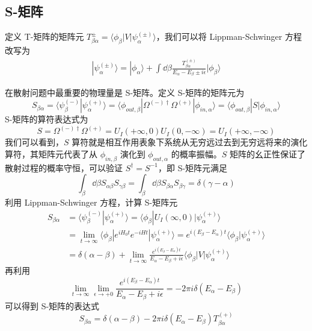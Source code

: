 \subsection{S-矩阵}
定义 T-矩阵的矩阵元 $T_{\beta\alpha}^{\pm}=\langle \phi_\beta|V|\psi_\alpha^{(\pm)}\rangle$，我们可以将 Lippman-Schwinger 方程改写为
\begin{equation}
\begin{aligned}
|\psi_\alpha^{(\pm)}\rangle= |\phi_{\alpha}\rangle+\int \dd\beta \frac{T_{\beta\alpha}^{(\pm)}}{E_\alpha-E_\beta\pm i\epsilon}|\phi_{\beta}\rangle
\end{aligned}
\end{equation}

在散射问题中最重要的物理量是 S-矩阵。定义 S-矩阵的矩阵元为
\begin{equation}
S_{\beta\alpha}=\langle \psi_{\beta}^{(-)}| \psi_{\alpha}^{(+)}\rangle=\langle \phi_{out,\beta}| \Omega^{(-)\dagger}\Omega^{(+)}|\phi_{in,\alpha}\rangle=\langle \phi_{out,\beta}| S |\phi_{in,\alpha}\rangle
\end{equation}
S-矩阵的算符表达式为
\begin{equation}
S=\Omega^{(-)\dagger}\Omega^{(+)}=U_I(+\infty,0)U_I(0,-\infty)=U_I(+\infty,-\infty)
\end{equation}
我们可以看到，$S$ 算符就是相互作用表象下系统从无穷远过去到无穷远将来的演化算符，其矩阵元代表了从 $\phi_{in,\beta}$ 演化到 $\phi_{out,\alpha}$ 的概率振幅。$S$ 矩阵的幺正性保证了散射过程的概率守恒，可以验证 $S^\dagger=S^{-1}$，即 S-矩阵元满足
\begin{equation}
\int_{\beta}\dd \beta S_{\alpha\beta}S_{\gamma\beta}=\int_{\beta}\dd \beta S_{\beta\alpha}S_{\beta\gamma}=\delta(\gamma-\alpha)
\end{equation}
利用 Lippman-Schwinger 方程，计算 S-矩阵元
\begin{equation}
\begin{aligned}
S_{\beta\alpha}&=\langle \psi_{\beta}^{(-)}| \psi_{\alpha}^{(+)}\rangle = \langle \phi_\beta|U_I(\infty,0)|\psi_{\alpha}^{(+)}\rangle\\
&=\lim\limits_{t\rightarrow \infty} \langle \phi_\beta|e^{iH_0 t}e^{-iHt}|\psi_{\alpha}^{(+)}\rangle=e^{i(E_\beta-E_\alpha)t}\langle \phi_\beta|\psi_{\alpha}^{(+)}\rangle\\
&=\delta(\alpha-\beta) + \lim\limits_{t\rightarrow \infty} \frac{e^{i(E_\beta-E_\alpha)t}}{E_\alpha-E_\beta+i\epsilon} \langle \phi_\beta|V|\psi_\alpha^{(+)}\rangle
\end{aligned}
\end{equation}
再利用
\begin{equation}
\lim\limits_{t\rightarrow \infty}\lim\limits_{\epsilon\rightarrow +0} \frac{e^{i(E_\beta-E_\alpha)t}}{E_\alpha-E_\beta+i\epsilon}=-2\pi i \delta(E_\alpha-E_\beta)
\end{equation}
可以得到 S-矩阵的表达式
\begin{equation}\label{eq_Smat_2}
S_{\beta\alpha}=\delta(\alpha-\beta)-2\pi i \delta(E_\alpha-E_\beta)T_{\beta\alpha}^{(+)}
\end{equation}

